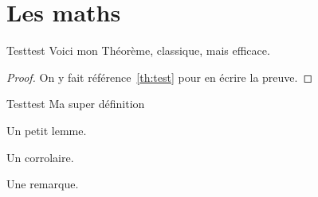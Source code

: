 \documentclass{matapli}
\begin{document}

\section{Les maths}

\begin{theorem}{Test}{test}
  Voici mon Théorème, classique, mais efficace.
\end{theorem}


\begin{proof}
  On y fait référence~\ref{th:test} pour en écrire la preuve.
\end{proof}

\begin{definition}{Test}{test}
  Ma super définition
\end{definition}

\begin{lemma}
  Un petit lemme.
\end{lemma}

\begin{corollary}
  Un corrolaire.
\end{corollary}

\begin{remark}
  Une remarque.
\end{remark}


\printbibliography[heading=subbibintoc]

\printauthors
\end{document}

